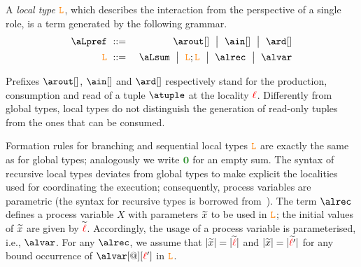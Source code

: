 %

A {\em local type} $\texttt{\textcolor{orange}L}$, which describes the interaction from the perspective of a single 
role,  is a term generated by the following grammar.
\begin{eqnarray*}
  \aLpref & \bnfdef &
                  \arout[]\bnfmid
                  \ain[] \bnfmid
                  \ard[] 
\\
  \aL & \bnfdef &
                  \aLsum \bnfmid
                  \aL; \aL \bnfmid
                   \alrec \bnfmid
  	        \alvar%
\end{eqnarray*}

Prefixes $\arout[]$, $\ain[]$ and $\ard[]$ respectively stand for the
production, consumption and read of a tuple $\atuple$ at the locality
${\color{red}\ell}$. Differently from global types, local types do not
distinguish the generation of read-only tuples from the ones that can
be consumed.

Formation rules for branching and sequential local types $\texttt{\textcolor{orange}L}$ are exactly the same as for 
global types; analogously we write $\nil$ for an empty sum. 
The syntax of recursive local types  deviates from global types to make 
explicit the localities used for coordinating the execution;
consequently, process 
variables are parametric (the syntax for recursive types is borrowed from~\cite{}).
The term $\alrec$ defines a process variable $X$ with parameters $\widetilde{x}$ to 
be used in $\texttt{\textcolor{orange}L}$; the initial values of $\widetilde{x}$ are given by $\widetilde{{\color{red}\ell}}$. Accordingly, 
the usage of a process variable is parameterised, i.e., $\alvar$.  For any $\alrec$, we assume that 
 $|\widetilde{x}| = |\widetilde{{\color{red}\ell}}|$ and  $|\widetilde{x}| = |\widetilde{{\color{red}\ell}'}|$ for any bound occurrence of $\alvar[@][\alocvar']$ in $\texttt{\textcolor{orange}L}$.


